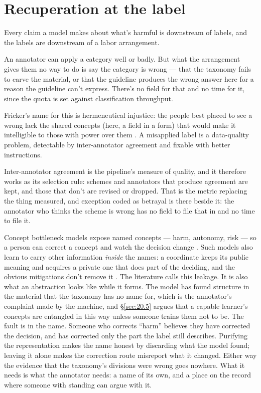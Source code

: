 \section{Recuperation at the label}
\label{sec:23.4}
Every claim a model makes about what's harmful is downstream of labels, and the labels are downstream of a labor arrangement.

An annotator can apply a category well or badly. But what the arrangement gives them no way to do is say the category is wrong — that the taxonomy fails to carve the material, or that the guideline produces the wrong answer here for a reason the guideline can't express. There's no field for that and no time for it, since the quota is set against classification throughput.

Fricker's name for this is hermeneutical injustice: the people best placed to see a wrong lack the shared concepts (here, a field in a form) that would make it intelligible to those with power over them \autocite{fricker2007epistemic}. A misapplied label is a data-quality problem, detectable by inter-annotator agreement and fixable with better instructions.

Inter-annotator agreement is the pipeline's measure of quality, and it therefore works as its selection rule: schemes and annotators that produce agreement are kept, and those that don't are revised or dropped.
That is the metric replacing the thing measured, and exception coded as betrayal is there beside it: the annotator who thinks the scheme is wrong has no field to file that in and no time to file it.

Concept bottleneck models expose named concepts — harm, autonomy, risk — so a person can correct a concept and watch the decision change \autocite{koh2020concept}. Such models also learn to carry other information \emph{inside} the names: a coordinate keeps its public meaning and acquires a private one that does part of the deciding, and the obvious mitigations don't remove it \autocite{mahinpei2021promises}. The literature calls this leakage. It is also what an abstraction looks like while it forms. The model has found structure in the material that the taxonomy has no name for, which is the annotator's complaint made by the machine, and \S\ref{sec:20.5} argues that a capable learner's concepts are entangled in this way unless someone trains them not to be. The fault is in the name. Someone who corrects “harm” believes they have corrected the decision, and has corrected only the part the label still describes. Purifying the representation makes the name honest by discarding what the model found; leaving it alone makes the correction route misreport what it changed. Either way the evidence that the taxonomy's divisions were wrong goes nowhere. What it needs is what the annotator needs: a name of its own, and a place on the record where someone with standing can argue with it.

